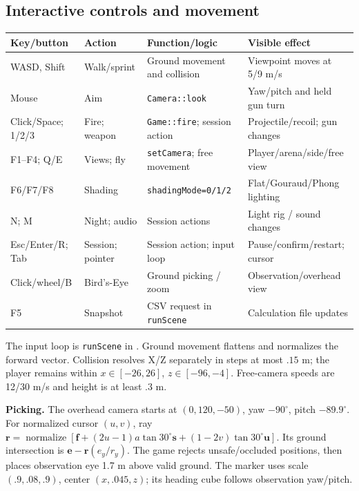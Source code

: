 \subsection{Interactive controls and movement}
\begin{center}\begin{tabularx}{\linewidth}{L{.17\linewidth}L{.17\linewidth}XX}\toprule
Key/button & Action & Function/logic & Visible effect \\\midrule
WASD, Shift & Walk/sprint & Ground movement and collision & Viewpoint moves at 5/9 m/s\\
Mouse & Aim & \texttt{Camera::look} & Yaw/pitch and held gun turn\\
Click/Space; 1/2/3 & Fire; weapon & \texttt{Game::fire}; session action & Projectile/recoil; gun changes\\
F1--F4; Q/E & Views; fly & \texttt{setCamera}; free movement & Player/arena/side/free view\\
F6/F7/F8 & Shading & \texttt{shadingMode=0/1/2} & Flat/Gouraud/Phong lighting\\
N; M & Night; audio & Session actions & Light rig / sound changes\\
Esc/Enter/R; Tab & Session; pointer & Session action; input loop & Pause/confirm/restart; cursor\\
Click/wheel/B & Bird's-Eye & Ground picking / zoom & Observation/overhead view\\
F5 & Snapshot & CSV request in \texttt{runScene} & Calculation file updates\\\bottomrule
\end{tabularx}\end{center}
The input loop is \texttt{runScene} in . Ground movement flattens and normalizes the forward vector. Collision resolves X/Z separately in steps at most $.15$ m; the player remains within $x\in[-26,26]$, $z\in[-96,-4]$. Free-camera speeds are 12/30 m/s and height is at least $.3$ m.

\textbf{Picking.} The overhead camera starts at $(0,120,-50)$, yaw $-90^\circ$, pitch $-89.9^\circ$. For normalized cursor $(u,v)$, ray $\mathbf r=\operatorname{normalize}[\mathbf f+(2u-1)a\tan30^\circ\mathbf s+(1-2v)\tan30^\circ\mathbf u]$. Its ground intersection is $\mathbf e-\mathbf r(e_y/r_y)$. The game rejects unsafe/occluded positions, then places observation eye 1.7 m above valid ground. The marker uses scale $(.9,.08,.9)$, center $(x,.045,z)$; its heading cube follows observation yaw/pitch.

